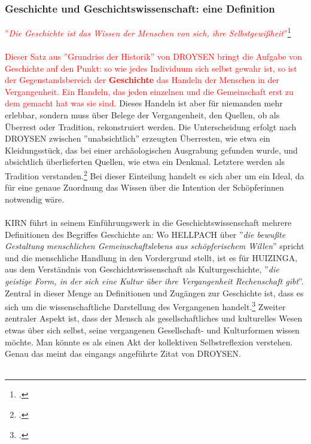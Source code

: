 \documentclass[12pt,a4paper]{article}
\begin{document}
\subsubsection{Geschichte und Geschichtswissenschaft: eine Definition}
\textcolor{red}{
''\textit{Die Geschichte ist das Wissen der Menschen von sich, ihre Selbstgewißheit}''\footcite[][S.111]{hardtwig1990studium}
\\
\\
Dieser Satz aus ''Grundriss der Historik'' von DROYSEN bringt die Aufgabe von Geschichte auf den Punkt: so wie jedes Individuum sich selbst gewahr ist, so ist der Gegenstandsbereich der \textbf{Geschichte} das Handeln der Menschen in der Vergangenheit. Ein Handeln, das jeden einzelnen und die Gemeinschaft erst zu dem gemacht hat was sie sind.
}
Dieses Handeln ist aber für niemanden mehr erlebbar, sondern muss über Belege der Vergangenheit, den Quellen, ob als Überrest oder Tradition, rekonstruiert werden. Die Unterscheidung erfolgt nach DROYSEN zwischen ''unabsichtlich'' erzeugten Überresten, wie etwa ein Kleidungsstück, das bei einer archäologischen Ausgrabung gefunden wurde, und absichtlich überlieferten Quellen, wie etwa ein Denkmal. Letztere werden als Tradition verstanden.\footcite[][49–55]{schulz2010neuere} Bei dieser Einteilung handelt es sich aber um ein Ideal, da für eine genaue Zuordnung das Wissen über die Intention der Schöpferinnen notwendig wäre. 
\\
\\
KIRN führt in seinem Einführungswerk in die Geschichtswissenschaft mehrere Definitionen des Begriffes Geschichte an: Wo HELLPACH über ''\textit{die bewußte Gestaltung menschlichen Gemeinschaftslebens aus schöpferischem Willen}'' spricht und die menschliche Handlung in den Vordergrund stellt, ist es für HUIZINGA, aus dem Verständnis von Geschichtswissenschaft als Kulturgeschichte, ''\textit{die geistige Form, in der sich eine Kultur über ihre Vergangenheit Rechenschaft gibt}''. Zentral in dieser Menge an Definitionen und Zugängen zur Geschichte ist, dass es sich um die wissenschaftliche Darstellung des Vergangenen handelt.\footcite[][S.7-12]{KirnPaul2015EidG} Zweiter zentraler Aspekt ist, dass der Mensch als gesellschaftliches und kulturelles Wesen etwas über sich selbst, seine vergangenen Gesellschaft- und Kulturformen wissen möchte. Man könnte es als einen Akt der kollektiven Selbstreflexion verstehen. Genau das meint das eingangs angeführte Zitat von DROYSEN.
\\
\\
\end{document}

